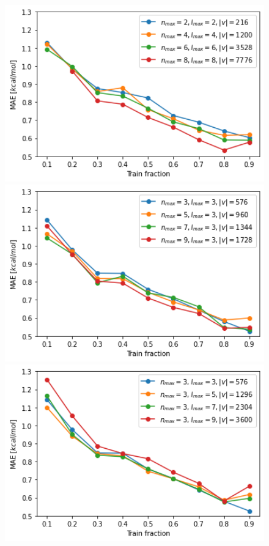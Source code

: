 \begin{figure}[H]
    \includegraphics[width=1.0\textwidth]{figures/regression/snap/fixnl.png}
  \endminipage\hfill
    \includegraphics[width=1.0\textwidth]{figures/regression/snap/fixl.png}
  \endminipage\hfill
    \includegraphics[width=1.0\textwidth]{figures/regression/snap/fixn.png}

\end{figure}
